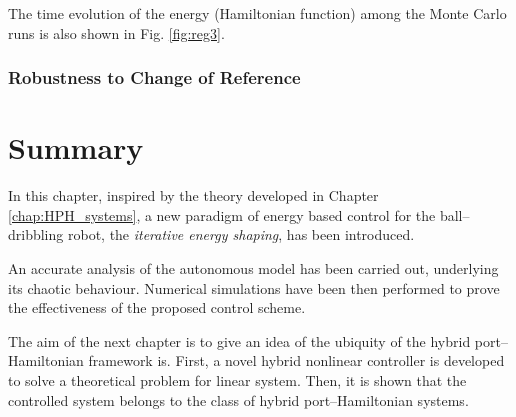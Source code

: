 The time evolution of the energy (Hamiltonian function) among the Monte Carlo runs is also shown in Fig. \ref{fig:reg3}.
%
\subsubsection{Robustness to Change of Reference}
%
\clearpage
\section{Summary}\label{sec:concl}
%
In this chapter, inspired by the theory developed in Chapter \ref{chap:HPH_systems}, a new paradigm of energy based control for the ball--dribbling robot, the \textit{iterative energy shaping}, has been introduced.
%
\newline

%
An accurate analysis of the autonomous model has been carried out, underlying its chaotic behaviour.
Numerical simulations have been then performed to prove the effectiveness of the proposed control scheme.
%
\newline

%
The aim of the next chapter is to give an idea of the ubiquity of the hybrid port--Hamiltonian framework is. First, a novel hybrid nonlinear controller is developed to solve a theoretical problem for linear system. Then, it is shown that the controlled system belongs to the class of hybrid port--Hamiltonian systems. 